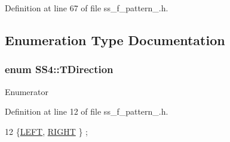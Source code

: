 Definition at line 67 of file ss\+\_\+f\+\_\+pattern\+\_.\+h.



\subsection{Enumeration Type Documentation}
\subsubsection[{\texorpdfstring{T\+Direction}{TDirection}}]{\setlength{\rightskip}{0pt plus 5cm}enum {\bf S\+S4\+::\+T\+Direction}\hspace{0.3cm}{\ttfamily [strong]}}\hypertarget{namespaceSS4_ac7fa695c4f9dc0b99e73fcbbf5311282}{}\label{namespaceSS4_ac7fa695c4f9dc0b99e73fcbbf5311282}
\begin{Desc}
\item[Enumerator]\par
\begin{description}
\item[{\em 
L\+E\+FT\hypertarget{namespaceSS4_ac7fa695c4f9dc0b99e73fcbbf5311282a684d325a7303f52e64011467ff5c5758}{}\label{namespaceSS4_ac7fa695c4f9dc0b99e73fcbbf5311282a684d325a7303f52e64011467ff5c5758}
}]\item[{\em 
R\+I\+G\+HT\hypertarget{namespaceSS4_ac7fa695c4f9dc0b99e73fcbbf5311282a21507b40c80068eda19865706fdc2403}{}\label{namespaceSS4_ac7fa695c4f9dc0b99e73fcbbf5311282a21507b40c80068eda19865706fdc2403}
}]\end{description}
\end{Desc}


Definition at line 12 of file ss\+\_\+f\+\_\+pattern\+\_.\+h.


\begin{DoxyCode}
12 \{\hyperlink{namespaceSS4_ac7fa695c4f9dc0b99e73fcbbf5311282a684d325a7303f52e64011467ff5c5758}{LEFT}, \hyperlink{namespaceSS4_ac7fa695c4f9dc0b99e73fcbbf5311282a21507b40c80068eda19865706fdc2403}{RIGHT} \} ;
\end{DoxyCode}
